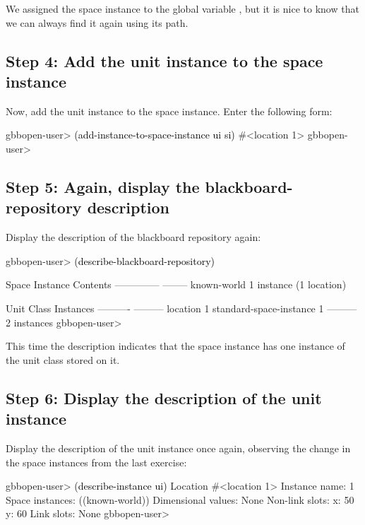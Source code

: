 \documentclass[10pt,twoside,english,pdftex]{article}
\begin{document}
We assigned the  space instance to the global variable
, but it is nice to know that we can always find it again using its
path.

\subsection*{Step 4: Add the unit instance to the space instance}

%
%
%
Now, add the  unit instance to the space instance.
Enter the following form:
%
\W\supp
\begin{example}
\textcolor{darkergray}{%
  gbbopen-user> \textcolor{black}{(add-instance-to-space-instance ui si)}
  #<location 1>
  gbbopen-user>}
\end{example}

\subsection*{Step 5: Again, display the blackboard-repository description}

%
Display the description of the blackboard repository again:
%
\W\supp
\begin{example}
\textcolor{darkergray}{%
  gbbopen-user> \textcolor{black}{(describe-blackboard-repository)}
  
  Space Instance                Contents
  --------------                --------
  known-world                   1 instance (1 location)

  Unit Class                    Instances
  ----------                    ---------
  location                              1
  standard-space-instance               1
                                ---------
                                        2 instances
  gbbopen-user>}
\end{example}

This time the description indicates that the  space
instance has one instance of the  unit class stored on
it.

\subsection*{Step 6: Display the description of the unit instance}

%
Display the description of the  unit instance once
again, observing the change in the space instances from the last exercise:
%
\W\supp
\begin{example}
\textcolor{darkergray}{%
  gbbopen-user> \textcolor{black}{(describe-instance ui)}
  Location #<location 1>
    Instance name: 1
    Space instances: ((known-world))
    Dimensional values: None
    Non-link slots:
      x:  50
      y:  60
    Link slots: None
  gbbopen-user>}
\end{example}
\end{document}
